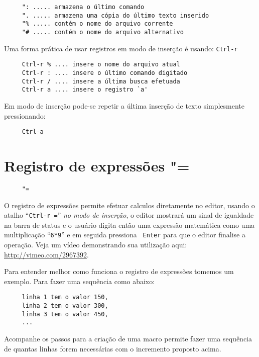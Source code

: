 \begin{verbatim}
     ": ..... armazena o último comando
     ". ..... armazena uma cópia do último texto inserido
     "% ..... contém o nome do arquivo corrente
     "# ..... contém o nome do arquivo alternativo
\end{verbatim}

Uma forma prática de usar registros em modo de inserção é usando:
\verb|Ctrl-r|


\begin{verbatim}
     Ctrl-r % .... insere o nome do arquivo atual
     Ctrl-r : .... insere o último comando digitado
     Ctrl-r / .... insere a última busca efetuada
     Ctrl-r a .... insere o registro `a'
\end{verbatim}

Em modo de inserção pode-se repetir a última inserção de texto
simplesmente pressionando:

\begin{verbatim}
     Ctrl-a
\end{verbatim}

\section{Registro de expressões "=}
\label{sec:Registro de expressões "=}

\begin{verbatim}
     "=
\end{verbatim}

O registro de expressões permite efetuar calculos diretamente no editor, usando
o atalho ``{\tt Ctrl-r =}'' {\em no modo de inserção}, o editor mostrará um
sinal de igualdade na barra de status e o usuário digita então uma expressão
matemática como uma multiplicação ``{\tt 6*9}'' e em seguida pressiona {\tt
Enter} para que o editor finalise a operação.  Veja um vídeo demonstrando sua
utilização aqui: \url{http://vimeo.com/2967392}.


Para entender melhor como funciona o registro de expressões tomemos um exemplo.
Para fazer uma sequência como abaixo:

\begin{verbatim}
     linha 1 tem o valor 150,
     linha 2 tem o valor 300,
     linha 3 tem o valor 450,
     ...
\end{verbatim}

Acompanhe os passos para a criação de uma macro permite fazer uma
sequência de quantas linhas forem necessárias com o incremento proposto acima.

